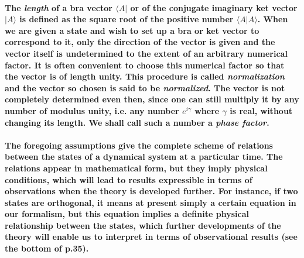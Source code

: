 \documentclass[10pt, kindle, oneside]{kindle}
\begin{document}
\paragraph{The \textit{length} of a bra vector $ \langle A | $ or of the conjugate imaginary ket vector $ |A \rangle $ is defined as the square root of the positive number $ \langle A | A \rangle $. When we are given a state and wish to set up a bra or ket vector to correspond to it, only the direction of the vector is given and the vector itself is undetermined to the extent of an arbitrary numerical factor. It is often convenient to choose this numerical factor so that the vector is of length unity. This procedure is called \textit{normalization} and the vector so chosen is said to be \textit{normalized}. The vector is not completely determined even then, since one can still multiply it by any number of modulus unity, i.e. any number $ e^{i\gamma} $ where $ \gamma $ is real, without changing its length. We shall call such a number a \textit{phase factor}.}
\paragraph{The foregoing assumptions give the complete scheme of relations between the states of a dynamical system at a particular time. The relations appear in mathematical form, but they imply physical conditions, which will lead to results expressible in terms of observations when the theory is developed further. For instance, if two states are orthogonal, it means at present simply a certain equation in our formalism, but this equation implies a definite physical relationship between the states, which further developments of the theory will enable us to interpret in terms of observational results (see the bottom of p.35).}
\end{document}
